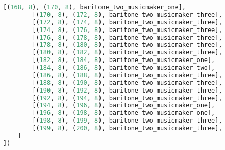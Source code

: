 \begin{lstlisting}[language=Python, caption=Invocation Source Code]
        [(168, 8), (170, 8), baritone_two_musicmaker_one],
        [(170, 8), (172, 8), baritone_two_musicmaker_three],
        [(172, 8), (174, 8), baritone_two_musicmaker_three],
        [(174, 8), (176, 8), baritone_two_musicmaker_three],
        [(176, 8), (178, 8), baritone_two_musicmaker_three],
        [(178, 8), (180, 8), baritone_two_musicmaker_three],
        [(180, 8), (182, 8), baritone_two_musicmaker_three],
        [(182, 8), (184, 8), baritone_two_musicmaker_one],
        [(184, 8), (186, 8), baritone_two_musicmaker_two],
        [(186, 8), (188, 8), baritone_two_musicmaker_three],
        [(188, 8), (190, 8), baritone_two_musicmaker_three],
        [(190, 8), (192, 8), baritone_two_musicmaker_three],
        [(192, 8), (194, 8), baritone_two_musicmaker_three],
        [(194, 8), (196, 8), baritone_two_musicmaker_one],
        [(196, 8), (198, 8), baritone_two_musicmaker_one],
        [(198, 8), (199, 8), baritone_two_musicmaker_three],
        [(199, 8), (200, 8), baritone_two_musicmaker_three],
    ]
])


\end{lstlisting}
